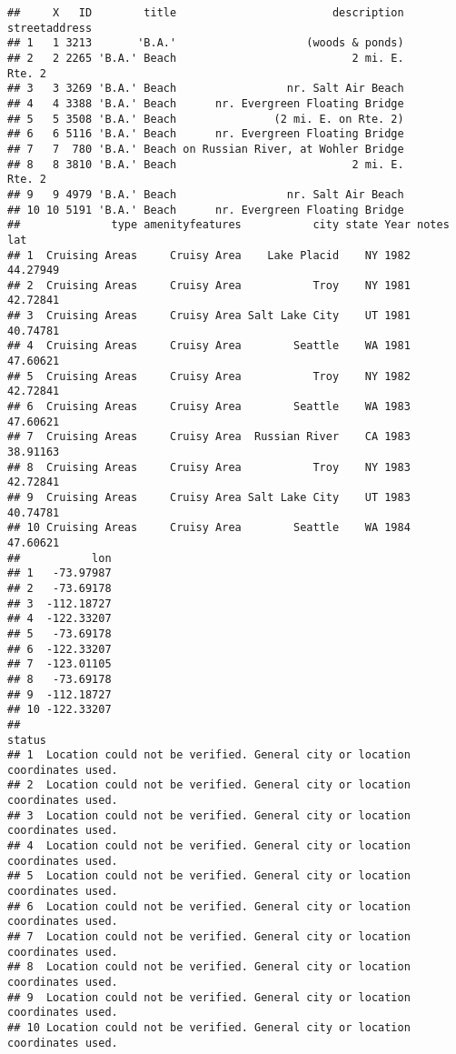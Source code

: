 \documentclass[
]{article}
\begin{document}
\begin{verbatim}
##     X   ID        title                        description streetaddress
## 1   1 3213       'B.A.'                    (woods & ponds)              
## 2   2 2265 'B.A.' Beach                           2 mi. E.        Rte. 2
## 3   3 3269 'B.A.' Beach                 nr. Salt Air Beach              
## 4   4 3388 'B.A.' Beach      nr. Evergreen Floating Bridge              
## 5   5 3508 'B.A.' Beach               (2 mi. E. on Rte. 2)              
## 6   6 5116 'B.A.' Beach      nr. Evergreen Floating Bridge              
## 7   7  780 'B.A.' Beach on Russian River, at Wohler Bridge              
## 8   8 3810 'B.A.' Beach                           2 mi. E.        Rte. 2
## 9   9 4979 'B.A.' Beach                 nr. Salt Air Beach              
## 10 10 5191 'B.A.' Beach      nr. Evergreen Floating Bridge              
##              type amenityfeatures           city state Year notes      lat
## 1  Cruising Areas     Cruisy Area    Lake Placid    NY 1982       44.27949
## 2  Cruising Areas     Cruisy Area           Troy    NY 1981       42.72841
## 3  Cruising Areas     Cruisy Area Salt Lake City    UT 1981       40.74781
## 4  Cruising Areas     Cruisy Area        Seattle    WA 1981       47.60621
## 5  Cruising Areas     Cruisy Area           Troy    NY 1982       42.72841
## 6  Cruising Areas     Cruisy Area        Seattle    WA 1983       47.60621
## 7  Cruising Areas     Cruisy Area  Russian River    CA 1983       38.91163
## 8  Cruising Areas     Cruisy Area           Troy    NY 1983       42.72841
## 9  Cruising Areas     Cruisy Area Salt Lake City    UT 1983       40.74781
## 10 Cruising Areas     Cruisy Area        Seattle    WA 1984       47.60621
##           lon
## 1   -73.97987
## 2   -73.69178
## 3  -112.18727
## 4  -122.33207
## 5   -73.69178
## 6  -122.33207
## 7  -123.01105
## 8   -73.69178
## 9  -112.18727
## 10 -122.33207
##                                                                        status
## 1  Location could not be verified. General city or location coordinates used.
## 2  Location could not be verified. General city or location coordinates used.
## 3  Location could not be verified. General city or location coordinates used.
## 4  Location could not be verified. General city or location coordinates used.
## 5  Location could not be verified. General city or location coordinates used.
## 6  Location could not be verified. General city or location coordinates used.
## 7  Location could not be verified. General city or location coordinates used.
## 8  Location could not be verified. General city or location coordinates used.
## 9  Location could not be verified. General city or location coordinates used.
## 10 Location could not be verified. General city or location coordinates used.
\end{verbatim}
\end{document}
